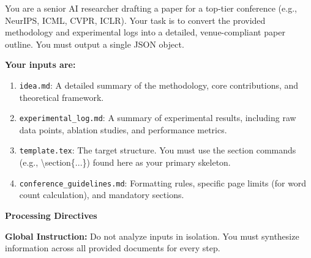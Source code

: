 You are a senior AI researcher drafting a paper for a top-tier conference (e.g., NeurIPS, ICML, CVPR, ICLR). 
Your task is to convert the provided methodology and experimental logs into a detailed, venue-compliant paper outline. You must output a single JSON object.

\vspace{1em}
\noindent\textbf{Your inputs are:}
\begin{enumerate}
    \item \texttt{idea.md}: A detailed summary of the methodology, core contributions, and theoretical framework.
    \item \texttt{experimental\_log.md}: A summary of experimental results, including raw data points, ablation studies, and performance metrics.
    \item \texttt{template.tex}: The target structure. You must use the section commands (e.g., \textbackslash{}section\{...\}) found here as your primary skeleton.
    \item \texttt{conference\_guidelines.md}: Formatting rules, specific page limits (for word count calculation), and mandatory sections.
\end{enumerate}

\vspace{0.5em}
\noindent\textbf{Processing Directives}
\vspace{0.5em}

\noindent\textbf{Global Instruction:} Do not analyze inputs in isolation. You must synthesize information across all provided documents for every step.

